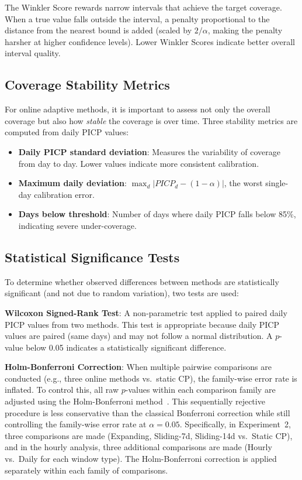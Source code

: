 The Winkler Score rewards narrow intervals that achieve the target coverage. When a true value falls outside the interval, a penalty proportional to the distance from the nearest bound is added (scaled by $2/\alpha$, making the penalty harsher at higher confidence levels). Lower Winkler Scores indicate better overall interval quality.

\subsection{Coverage Stability Metrics}
\label{subsec:stability_metrics}

For online adaptive methods, it is important to assess not only the overall coverage but also how \emph{stable} the coverage is over time. Three stability metrics are computed from daily PICP values:

\begin{itemize}
    \item \textbf{Daily PICP standard deviation}: Measures the variability of coverage from day to day. Lower values indicate more consistent calibration.
    \item \textbf{Maximum daily deviation}: $\max_d |PICP_d - (1-\alpha)|$, the worst single-day calibration error.
    \item \textbf{Days below threshold}: Number of days where daily PICP falls below 85\%, indicating severe under-coverage.
\end{itemize}

\subsection{Statistical Significance Tests}
\label{subsec:statistical_tests}

To determine whether observed differences between methods are statistically significant (and not due to random variation), two tests are used:

\textbf{Wilcoxon Signed-Rank Test}: A non-parametric test applied to paired daily PICP values from two methods. This test is appropriate because daily PICP values are paired (same days) and may not follow a normal distribution. A $p$-value below 0.05 indicates a statistically significant difference.

\textbf{Holm-Bonferroni Correction}: When multiple pairwise comparisons are conducted (e.g., three online methods vs.\ static CP), the family-wise error rate is inflated. To control this, all raw $p$-values within each comparison family are adjusted using the Holm-Bonferroni method~\cite{holm1979simple}. This sequentially rejective procedure is less conservative than the classical Bonferroni correction while still controlling the family-wise error rate at $\alpha = 0.05$. Specifically, in Experiment~2, three comparisons are made (Expanding, Sliding-7d, Sliding-14d vs.\ Static CP), and in the hourly analysis, three additional comparisons are made (Hourly vs.\ Daily for each window type). The Holm-Bonferroni correction is applied separately within each family of comparisons.

